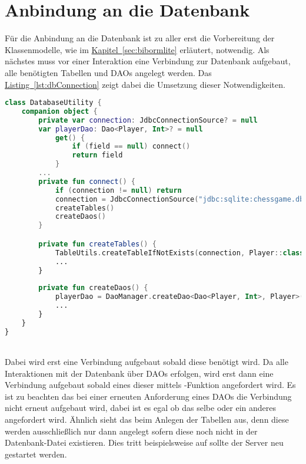 \section{Anbindung an die Datenbank}
Für die Anbindung an die Datenbank ist zu aller erst die Vorbereitung der Klassenmodelle, wie im \hyperref[sec:bibormlite]{Kapitel~\ref{sec:bibormlite}} erläutert, notwendig.
Als nächstes muss vor einer Interaktion eine Verbindung zur Datenbank aufgebaut, alle benötigten Tabellen und \glspl{DAO} angelegt werden. Das \hyperref[lst:dbConnection]{Listing~\ref{lst:dbConnection}} zeigt dabei die Umsetzung  dieser Notwendigkeiten.
\\
\begin{lstlisting}[style=lstStyleFramed, language=Kotlin, caption={Verbindungsaufbau \& Initialisierung der SQLite Datenbank}, label=lst:dbConnection, float]
class DatabaseUtility {
	companion object {
		private var connection: JdbcConnectionSource? = null
		var playerDao: Dao<Player, Int>? = null
			get() {
				if (field == null) connect()
				return field
			}
		...
		private fun connect() {
			if (connection != null) return
			connection = JdbcConnectionSource("jdbc:sqlite:chessgame.db")
			createTables()
			createDaos()
		}

		private fun createTables() {
			TableUtils.createTableIfNotExists(connection, Player::class.java)
			...
		}
		
		private fun createDaos() {
			playerDao = DaoManager.createDao<Dao<Player, Int>, Player>(connection, Player::class.java)
			...
		}
	}
}
\end{lstlisting}
\\
Dabei wird erst eine Verbindung aufgebaut sobald diese benötigt wird. Da alle Interaktionen mit der Datenbank über \glspl{DAO} erfolgen, wird erst dann eine Verbindung aufgebaut sobald eines dieser mittels -Funktion angefordert wird. Es ist zu beachten das bei einer erneuten Anforderung eines \glspl{DAO} die Verbindung nicht erneut aufgebaut wird, dabei ist es egal ob das selbe oder ein anderes angefordert wird. Ähnlich sieht das beim Anlegen der Tabellen aus, denn diese werden ausschließlich nur dann angelegt sofern diese noch nicht in der Datenbank-Datei existieren. Dies tritt beispielsweise auf sollte der Server neu gestartet werden.

